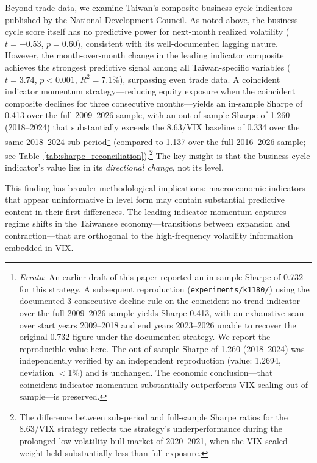 Beyond trade data, we examine Taiwan's composite business cycle indicators published by the National Development Council. As noted above, the business cycle score itself has no predictive power for next-month realized volatility ($t = -0.53$, $p = 0.60$), consistent with its well-documented lagging nature. However, the month-over-month change in the leading indicator composite achieves the strongest predictive signal among all Taiwan-specific variables ($t = 3.74$, $p < 0.001$, $R^2 = 7.1\%$), surpassing even trade data. A coincident indicator momentum strategy---reducing equity exposure when the coincident composite declines for three consecutive months---yields an in-sample Sharpe of 0.413 over the full 2009--2026 sample, with an out-of-sample Sharpe of 1.260 (2018--2024) that substantially exceeds the $8.63/\text{VIX}$ baseline of 0.334 over the same 2018--2024 sub-period\footnote{\textit{Errata}: An earlier draft of this paper reported an in-sample Sharpe of 0.732 for this strategy. A subsequent reproduction (\texttt{experiments/k1180/}) using the documented 3-consecutive-decline rule on the coincident no-trend indicator over the full 2009--2026 sample yields Sharpe 0.413, with an exhaustive scan over start years 2009--2018 and end years 2023--2026 unable to recover the original 0.732 figure under the documented strategy. We report the reproducible value here. The out-of-sample Sharpe of 1.260 (2018--2024) was independently verified by an independent reproduction (value: 1.2694, deviation $<$1\%) and is unchanged. The economic conclusion---that coincident indicator momentum substantially outperforms VIX scaling out-of-sample---is preserved.} (compared to 1.137 over the full 2016--2026 sample; see Table~\ref{tab:sharpe_reconciliation}).\footnote{The difference between sub-period and full-sample Sharpe ratios for the $8.63/\text{VIX}$ strategy reflects the strategy's underperformance during the prolonged low-volatility bull market of 2020--2021, when the VIX-scaled weight held substantially less than full exposure.} The key insight is that the business cycle indicator's value lies in its \textit{directional change}, not its level.

This finding has broader methodological implications: macroeconomic indicators that appear uninformative in level form may contain substantial predictive content in their first differences. The leading indicator momentum captures regime shifts in the Taiwanese economy---transitions between expansion and contraction---that are orthogonal to the high-frequency volatility information embedded in VIX.

